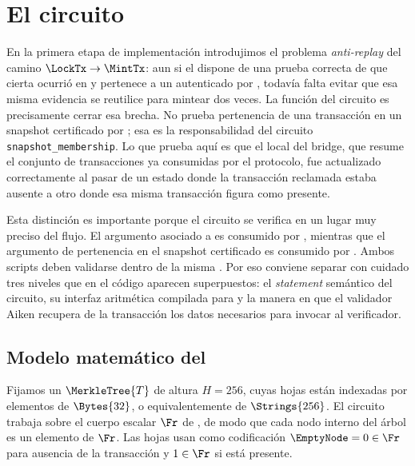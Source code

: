 
\section{El circuito \TxSetUpdateCircuit}

En la primera etapa de implementación introdujimos el problema \textit{anti-replay} del camino $\LockTx \rightarrow \MintTx$: aun si el \zkBridge dispone de una prueba correcta de que cierta \LockTx ocurrió en \Cardano y pertenece a un \TransactionSnapshot autenticado por \Mithril, todavía falta evitar que esa misma evidencia se reutilice para mintear dos veces. La función del circuito \TxSetUpdateCircuit es precisamente cerrar esa brecha. No prueba pertenencia de una transacción en un snapshot certificado por \Mithril; esa es la responsabilidad del circuito \texttt{snapshot\_membership}. Lo que prueba aquí es que el \SMT local del bridge, que resume el conjunto de transacciones ya consumidas por el protocolo, fue actualizado correctamente al pasar de un estado donde la transacción reclamada estaba ausente a otro donde esa misma transacción figura como presente.

Esta distinción es importante porque el circuito se verifica \Onchain en un lugar muy preciso del flujo. El argumento \Groth asociado a \TxSetUpdateCircuit es consumido por \TxsUpdaterMintingValidator, mientras que el argumento de pertenencia en el snapshot certificado es consumido por \MintingValidator. Ambos scripts deben validarse dentro de la misma \MintTx. Por eso conviene separar con cuidado tres niveles que en el código aparecen superpuestos: el \emph{statement} semántico del circuito, su interfaz aritmética compilada para \Groth y la manera en que el validador Aiken recupera de la transacción los datos necesarios para invocar al verificador.

\subsection{Modelo matemático del \SMT}

Fijamos un \SMT $\MerkleTree{T}$ de altura $H = 256$, cuyas hojas están indexadas por elementos de $\Bytes{32}$, o equivalentemente de $\Strings{256}$. El circuito trabaja sobre el cuerpo escalar $\Fr$ de \BLS, de modo que cada nodo interno del árbol es un elemento de $\Fr$. Las hojas usan como codificación $\EmptyNode = 0 \in \Fr$ para ausencia de la transacción y $1 \in \Fr$ si está presente.


